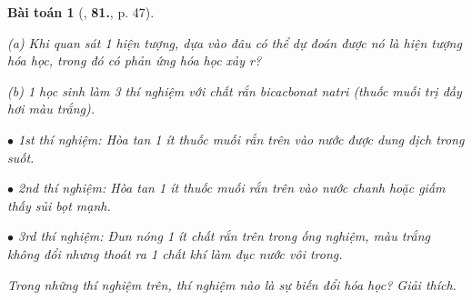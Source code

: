 \documentclass{article}
\numberwithin{equation}{section}
\newtheorem{baitoan}{Bài toán}
\begin{document}
\begin{baitoan}[\cite{An_400_BT_Hoa_Hoc_8_2020}, \textbf{81.}, p. 47]
	\begin{enumerate*}
		\item[(a)] Khi quan sát 1 hiện tượng, dựa vào đâu có thể dự đoán được nó là hiện tượng hóa học, trong đó có phản ứng hóa học xảy r?
		\item[(b)] 1 học sinh làm 3 thí nghiệm với chất rắn bicacbonat natri \emph{} (thuốc muối trị đầy hơi màu trắng).
		\begin{enumerate*}
			\item[$\bullet$] 1st thí nghiệm: Hòa tan 1 ít thuốc muối rắn trên vào nước được dung dịch trong suốt.
			\item[$\bullet$] 2nd thí nghiệm: Hòa tan 1 ít thuốc muối rắn trên vào nước chanh hoặc giấm thấy sủi bọt mạnh.
			\item[$\bullet$] 3rd thí nghiệm: Đun nóng 1 ít chất rắn trên trong ống nghiệm, màu trắng không đổi nhưng thoát ra 1 chất khí làm đục nước vôi trong.
		\end{enumerate*}
		Trong những thí nghiệm trên, thí nghiệm nào là sự biến đổi hóa học? Giải thích.
	\end{enumerate*}
\end{baitoan}

\end{document}
